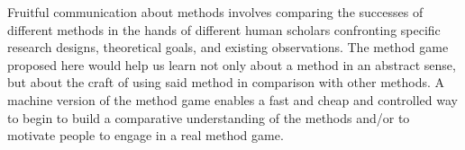 \documentclass[12pt]{article}
\begin{document}
Fruitful communication about methods involves comparing the successes of
different methods in the hands of different human scholars confronting
specific research designs, theoretical goals, and existing observations. The
method game proposed here would help us learn not only about a method in
an abstract sense, but about the craft of using said method in comparison with
other methods. A machine version of the method game enables a fast and cheap
and controlled way to begin to build a comparative understanding of the
methods and/or to motivate people to engage in a real method game.





\end{document}

